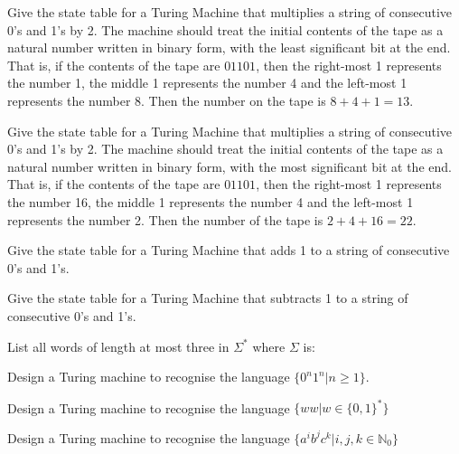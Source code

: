 \documentclass[addpoints,12pt]{exam}
\begin{document}
\begin{questions}
\question
Give the state table for a Turing Machine that multiplies a string of consecutive 0's and 1's by 2.
The machine should treat the initial contents of the tape as a natural number written in binary form, with the least significant bit at the end.
That is, if the contents of the tape are $01101$, then the right-most 1 represents the number 1, the middle 1 represents the number 4 and the left-most 1 represents the number 8.
Then the number on the tape is $8+4+1=13$.


\question
Give the state table for a Turing Machine that multiplies a string of consecutive 0's and 1's by 2.
The machine should treat the initial contents of the tape as a natural number written in binary form, with the most significant bit at the end.
That is, if the contents of the tape are $01101$, then the right-most 1 represents the number 16, the middle 1 represents the number 4 and the left-most 1 represents the number 2.
Then the number of the tape is $2+4+16=22$.

\question
Give the state table for a Turing Machine that adds 1 to a string of consecutive 0's and 1's.

\question
Give the state table for a Turing Machine that subtracts 1 to a string of consecutive 0's and 1's.


\question
List all words of length at most three in $\Sigma^*$ where $\Sigma$ is:

\question
Design a Turing machine to recognise the language $\{ 0^n 1^n | n \geq 1 \}$.

\question
Design a Turing machine to recognise the language $\{ ww | w \in \{ 0,1 \}^* \}$

\question
Design a Turing machine to recognise the language $\{ a^ib^jc^k | i,j,k \in \mathbb{N}_0 \}$

\end{questions}




\end{document}
